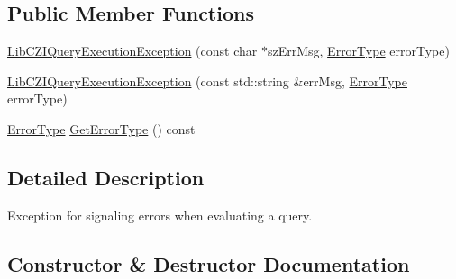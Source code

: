 \subsection*{Public Member Functions}
\begin{DoxyCompactItemize}
\item 
\hyperlink{classlib_c_z_i_1_1_lib_c_z_i_query_execution_exception_a9d19dc34e051c17ae74906794b72107f}{Lib\+C\+Z\+I\+Query\+Execution\+Exception} (const char $\ast$sz\+Err\+Msg, \hyperlink{classlib_c_z_i_1_1_lib_c_z_i_query_execution_exception_a7420fe8895248c44d16cf34f23f0c6a2}{Error\+Type} error\+Type)
\item 
\hyperlink{classlib_c_z_i_1_1_lib_c_z_i_query_execution_exception_a15b965e779ae464f4d2b5c1e7948db9a}{Lib\+C\+Z\+I\+Query\+Execution\+Exception} (const std\+::string \&err\+Msg, \hyperlink{classlib_c_z_i_1_1_lib_c_z_i_query_execution_exception_a7420fe8895248c44d16cf34f23f0c6a2}{Error\+Type} error\+Type)
\item 
\hyperlink{classlib_c_z_i_1_1_lib_c_z_i_query_execution_exception_a7420fe8895248c44d16cf34f23f0c6a2}{Error\+Type} \hyperlink{classlib_c_z_i_1_1_lib_c_z_i_query_execution_exception_a6ac7e255c61dae5fc104f0ae54d10513}{Get\+Error\+Type} () const
\end{DoxyCompactItemize}


\subsection{Detailed Description}
Exception for signaling errors when evaluating a query. 

\subsection{Constructor \& Destructor Documentation}
\mbox{\label{classlib_c_z_i_1_1_lib_c_z_i_query_execution_exception_a9d19dc34e051c17ae74906794b72107f}} 
